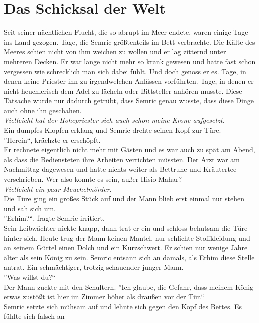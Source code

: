 \chapter{Das Schicksal der Welt}

Seit seiner nächtlichen Flucht, die so abrupt im Meer endete, waren einige Tage ins Land 
gezogen. Tage, die Semric größtenteils im Bett verbrachte. Die Kälte des Meeres schien nicht von ihm 
weichen zu wollen und er lag zitternd unter mehreren Decken. Er war lange nicht mehr so krank 
gewesen und hatte fast schon vergessen wie schrecklich man sich dabei fühlt. Und doch genoss er es. 
Tage, in denen keine Priester ihn zu irgendwelchen Anlässen vorführten. Tage, in denen er nicht 
heuchlerisch dem Adel zu lächeln oder Bittsteller anhören musste. Diese Tatsache wurde nur dadurch 
getrübt, dass Semric genau wusste, dass diese Dinge auch ohne ihn geschahen.\\
\textit{Vielleicht hat der Hohepriester sich auch schon meine Krone aufgesetzt.}\\
Ein dumpfes Klopfen erklang und Semric drehte seinen Kopf zur Türe.\\
''Herein``, krächzte er erschöpft.\\
Er rechnete eigentlich nicht mehr mit Gästen und es war auch zu spät am Abend, als dass die 
Bediensteten ihre Arbeiten verrichten müssten. Der Arzt war am Nachmittag dagewesen und hatte 
nichts 
weiter als Bettruhe und Kräutertee verschrieben. Wer also konnte es sein, außer Hisio-Mahar?\\
\textit{Vielleicht ein paar Meuchelmörder.}\\
Die Türe ging ein großes Stück auf und der Mann blieb erst einmal nur stehen und sah sich um. \\
''Erhim?``, fragte Semric irritiert.\\
Sein Leibwächter nickte knapp, dann trat er ein und schloss behutsam die Türe hinter sich. Heute 
trug der Mann keinen Mantel, nur schlichte Stoffkleidung und an seinem Gürtel einen Dolch und ein 
Kurzschwert. Er schien nur wenige Jahre älter als sein König zu sein. Semric entsann sich an 
damals, 
als Erhim diese Stelle antrat. Ein schmächtiger, trotzig schauender junger Mann. \\
''Was willst du?``\\
Der Mann zuckte mit den Schultern. ''Ich glaube, die Gefahr, dass meinem König etwas zustößt ist 
hier 
im Zimmer höher als draußen vor der Tür.``\\
Semric setzte sich mühsam auf und lehnte sich gegen den Kopf des Bettes. Es fühlte sich falsch an 
